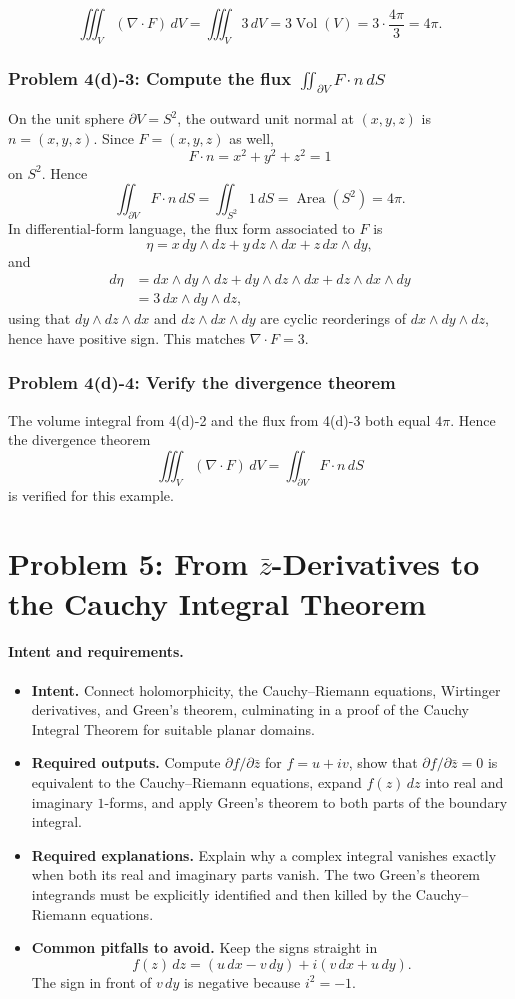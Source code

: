 \documentclass[11pt]{article}
\newenvironment{intentrequirements}{%
\paragraph{Intent and requirements.}
\begin{itemize}[leftmargin=*, itemsep=0.25em]
}{%
\end{itemize}
}
\begin{document}
\[
 \iiint_V(\nabla\cdot F)\,dV
 =
 \iiint_V3\,dV
 =
 3\operatorname{Vol}(V)
 =
 3\cdot\frac{4\pi}{3}
 =
 4\pi.
\]

\subsubsection*{Problem 4(d)-3: Compute the flux $\iint_{\partial V}F\cdot n\,dS$}

On the unit sphere $\partial V=S^2$, the outward unit normal at $(x,y,z)$ is $n=(x,y,z)$. Since $F=(x,y,z)$ as well,
\[
 F\cdot n=x^2+y^2+z^2=1
\]
on $S^2$. Hence
\[
 \iint_{\partial V}F\cdot n\,dS
 =
 \iint_{S^2}1\,dS
 =
 \operatorname{Area}(S^2)=4\pi.
\]
In differential-form language, the flux form associated to $F$ is
\[
 \eta=x\,dy\wedge dz+y\,dz\wedge dx+z\,dx\wedge dy,
\]
and
\[
\begin{aligned}
 d\eta
 &=
 dx\wedge dy\wedge dz
 +dy\wedge dz\wedge dx
 +dz\wedge dx\wedge dy\\
 &=
 3\,dx\wedge dy\wedge dz,
\end{aligned}
\]
using that $dy\wedge dz\wedge dx$ and $dz\wedge dx\wedge dy$ are cyclic reorderings of $dx\wedge dy\wedge dz$, hence have positive sign. This matches $\nabla\cdot F=3$.

\subsubsection*{Problem 4(d)-4: Verify the divergence theorem}

The volume integral from 4(d)-2 and the flux from 4(d)-3 both equal $4\pi$. Hence the divergence theorem
\[
 \iiint_V(\nabla\cdot F)\,dV
 =
 \iint_{\partial V}F\cdot n\,dS
\]
is verified for this example.

\section*{Problem 5: From $\bar z$-Derivatives to the Cauchy Integral Theorem}

\begin{intentrequirements}
\item \textbf{Intent.} Connect holomorphicity, the Cauchy--Riemann equations, Wirtinger derivatives, and Green's theorem, culminating in a proof of the Cauchy Integral Theorem for suitable planar domains.
\item \textbf{Required outputs.} Compute $\partial f/\partial\bar z$ for $f=u+iv$, show that $\partial f/\partial\bar z=0$ is equivalent to the Cauchy--Riemann equations, expand $f(z)\,dz$ into real and imaginary $1$-forms, and apply Green's theorem to both parts of the boundary integral.
\item \textbf{Required explanations.} Explain why a complex integral vanishes exactly when both its real and imaginary parts vanish. The two Green's theorem integrands must be explicitly identified and then killed by the Cauchy--Riemann equations.
\item \textbf{Common pitfalls to avoid.} Keep the signs straight in
\[
 f(z)\,dz=(u\,dx-v\,dy)+i(v\,dx+u\,dy).
\]
The sign in front of $v\,dy$ is negative because $i^2=-1$.
\end{intentrequirements}
\end{document}
